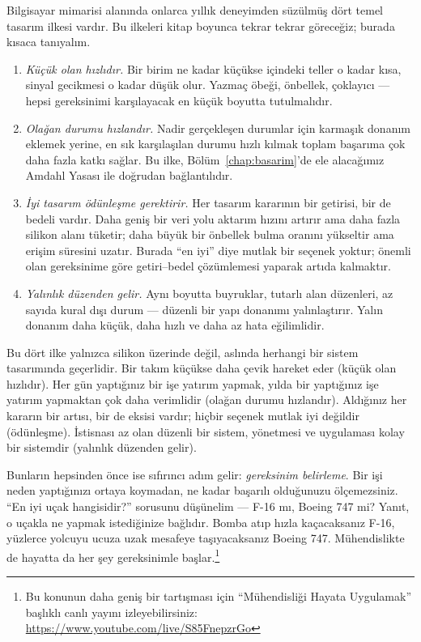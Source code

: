 Bilgisayar mimarisi alanında onlarca yıllık deneyimden süzülmüş dört temel tasarım ilkesi vardır. Bu ilkeleri kitap boyunca tekrar tekrar göreceğiz; burada kısaca tanıyalım.

\begin{enumerate}
    \item \emph{Küçük olan hızlıdır.} Bir birim ne kadar küçükse içindeki teller o kadar kısa, sinyal gecikmesi o kadar düşük olur. Yazmaç öbeği, önbellek, çoklayıcı --- hepsi gereksinimi karşılayacak en küçük boyutta tutulmalıdır.
    \item \emph{Olağan durumu hızlandır.} Nadir gerçekleşen durumlar için karmaşık donanım eklemek yerine, en sık karşılaşılan durumu hızlı kılmak toplam başarıma çok daha fazla katkı sağlar. Bu ilke, Bölüm~\ref{chap:basarim}'de ele alacağımız Amdahl Yasası ile doğrudan bağlantılıdır.
    \item \emph{İyi tasarım ödünleşme gerektirir.} Her tasarım kararının bir getirisi, bir de bedeli vardır. Daha geniş bir veri yolu aktarım hızını artırır ama daha fazla silikon alanı tüketir; daha büyük bir önbellek bulma oranını yükseltir ama erişim süresini uzatır. Burada ``en iyi'' diye mutlak bir seçenek yoktur; önemli olan gereksinime göre getiri--bedel çözümlemesi yaparak artıda kalmaktır.
    \item \emph{Yalınlık düzenden gelir.} Aynı boyutta buyruklar, tutarlı alan düzenleri, az sayıda kural dışı durum --- düzenli bir yapı donanımı yalınlaştırır. Yalın donanım daha küçük, daha hızlı ve daha az hata eğilimlidir.
\end{enumerate}

\begin{bilginot}
Bu dört ilke yalnızca silikon üzerinde değil, aslında herhangi bir sistem tasarımında geçerlidir. Bir takım küçükse daha çevik hareket eder (küçük olan hızlıdır). Her gün yaptığınız bir işe yatırım yapmak, yılda bir yaptığınız işe yatırım yapmaktan çok daha verimlidir (olağan durumu hızlandır). Aldığınız her kararın bir artısı, bir de eksisi vardır; hiçbir seçenek mutlak iyi değildir (ödünleşme). İstisnası az olan düzenli bir sistem, yönetmesi ve uygulaması kolay bir sistemdir (yalınlık düzenden gelir).

Bunların hepsinden önce ise sıfırıncı adım gelir: \emph{gereksinim belirleme}. Bir işi neden yaptığınızı ortaya koymadan, ne kadar başarılı olduğunuzu ölçemezsiniz. ``En iyi uçak hangisidir?'' sorusunu düşünelim --- F-16 mı, Boeing 747 mi? Yanıt, o uçakla ne yapmak istediğinize bağlıdır. Bomba atıp hızla kaçacaksanız F-16, yüzlerce yolcuyu ucuza uzak mesafeye taşıyacaksanız Boeing 747. Mühendislikte de hayatta da her şey gereksinimle başlar.\footnote{Bu konunun daha geniş bir tartışması için ``Mühendisliği Hayata Uygulamak'' başlıklı canlı yayını izleyebilirsiniz: \url{https://www.youtube.com/live/S85FnepzrGo}}
\end{bilginot}

